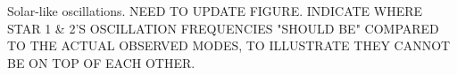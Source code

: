 \label{fig:seismo} Solar-like oscillations. NEED TO UPDATE FIGURE. INDICATE WHERE STAR 1 & 2'S OSCILLATION FREQUENCIES "SHOULD BE" COMPARED TO THE ACTUAL OBSERVED MODES, TO ILLUSTRATE THEY CANNOT BE ON TOP OF EACH OTHER.
    
    
    